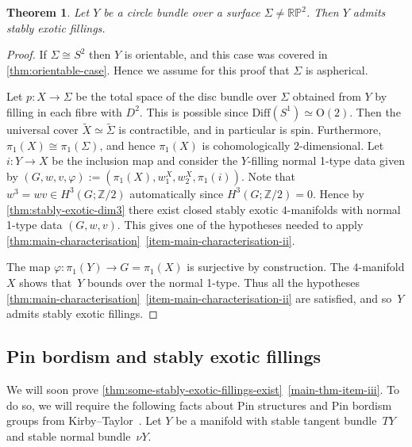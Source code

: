 \documentclass[a4paper, reqno]{amsart}
\newtheorem{theorem}[proposition]{Theorem}
\theoremstyle{definition}
\theoremstyle{remark}
\newcommand{\Diff}{\text{Diff}}
\newcommand{\Z}{\mathbb{Z}}
\newcommand{\wt}{\widetilde}
\newcommand{\RP}{\mathbb{RP}}
\newcommand{\OO}{\mathrm{O}}
\begin{document}
\begin{theorem}\label{theorem:circle-bundle-case}
    Let $Y$ be a circle bundle over a surface $\Sigma \neq \RP^2$. Then $Y$ admits stably exotic fillings. 
\end{theorem}

\begin{proof}
If $\Sigma \cong S^2$ then $Y$ is orientable, and this case was covered in \cref{thm:orientable-case}.  
Hence we assume for this proof that $\Sigma$ is aspherical.

    Let $p \colon X \to \Sigma$ be the total space of  the disc bundle over $\Sigma$ obtained from $Y$ by filling in each fibre with $D^2$. This is possible since $\Diff(S^1) \simeq \OO(2)$. Then the universal cover $\wt X \simeq \wt{\Sigma}$ is contractible, and in particular is spin. 
    Furthermore, $\pi_1(X)\cong \pi_1(\Sigma)$, and hence $\pi_1(X)$ is cohomologically $2$-dimensional. 
    Let $i\colon Y\to X$ be the inclusion map and consider the $Y$-filling normal 1-type data given by $(G,w,v,\varphi) := (\pi_1(X),w_1^X,w_2^X,\pi_1(i))$.  
    Note that $w^3=wv\in H^3(G;\Z/2)$ automatically since $H^3(G;\Z/2)=0$. Hence by \cref{thm:stably-exotic-dim3} there exist closed stably exotic $4$-manifolds with normal 1-type data $(G,w,v)$. This gives one of the hypotheses needed to apply \cref{thm:main-characterisation}~\eqref{item-main-characterisation-ii}.

The map $\varphi \colon \pi_1(Y) \to G=\pi_1(X)$ is surjective by construction. The $4$-manifold $X$  shows that~$Y$ bounds over the normal 1-type. Thus all the hypotheses \cref{thm:main-characterisation}~\eqref{item-main-characterisation-ii} are satisfied, and so~$Y$ admits stably exotic fillings. 
\end{proof}




\subsection{Pin bordism and stably exotic fillings}\label{section:pin-bordism} 
We will soon prove \cref{thm:some-stably-exotic-fillings-exist}~\eqref{main-thm-item-iii}. To do so, we will require the following facts about Pin structures and Pin bordism groups from Kirby--Taylor~\cite{kirby-taylor:pin}. 
Let $Y$ be a manifold with stable tangent bundle~$TY$ and stable normal bundle~$\nu Y$. 
\end{document}
